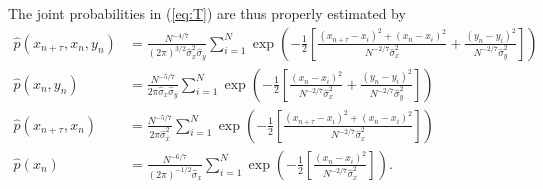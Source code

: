 \documentclass[12pt,a4paper,twoside,english,fleqn,preprint,aps,prb]{revtex4}
\begin{document}
The joint probabilities in (\ref{eq:T}) are thus properly estimated by
\begin{align}
  \hat{p}(x_{n+\tau}, x_n, y_n) &= \frac{N^{-4/7}}{(2\pi)^{3/2} \hat{\sigma}_x^2 \hat{\sigma}_y} \sum_{i=1}^N \exp \left(-\frac{1}{2} \left[
                                       \frac{(x_{n+\tau}-x_i)^2 + (x_n - x_i)^2}{N^{-2/7}\hat{\sigma}_x^2} + \frac{(y_n - y_i)^2}{N^{-2/7}\hat{\sigma}_y^2}
                                   \right] \right)  \\
  \hat{p}(x_n, y_n) &= \frac{N^{-5/7}}{2\pi \hat{\sigma}_x \hat{\sigma}_y} \sum_{i=1}^N \exp \left(-\frac{1}{2} \left[
                                       \frac{(x_n - x_i)^2}{N^{-2/7}\hat{\sigma}_x^2} + \frac{(y_n - y_i)^2}{N^{-2/7}\hat{\sigma}_y^2}
                                   \right] \right)  \\
  \hat{p}(x_{n+\tau}, x_n) &= \frac{N^{-5/7}}{2\pi \hat{\sigma}_x^2} \sum_{i=1}^N \exp \left(-\frac{1}{2} \left[
                                       \frac{(x_{n+\tau} - x_i)^2 + (x_n - x_i)^2}{N^{-2/7}\hat{\sigma}_x^2}
                                   \right] \right)  \\
  \hat{p}(x_n) &= \frac{N^{-6/7}}{(2\pi)^{-1/2} \hat{\sigma}_x} \sum_{i=1}^N \exp \left(-\frac{1}{2} \left[
                                       \frac{(x_n - x_i)^2}{N^{-2/7}\hat{\sigma}_x^2}
                                   \right] \right).
\end{align}





\end{document}
